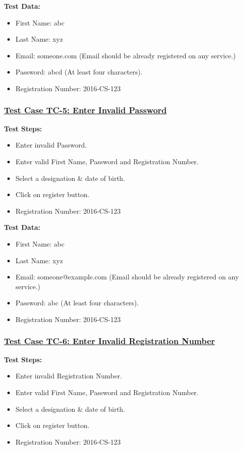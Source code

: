\textbf{Test Data:}
\begin{itemize}

\item First Name: abc
\item Last Name: xyz
\item Email: someone.com (Email should be already registered on any service.)
\item Password: abcd (At least four characters).
\item Registration Number: 2016-CS-123

\end{itemize}

\subsubsection{\underline{Test Case TC-5: Enter Invalid Password}}
\textbf{Test Steps:}
\begin{itemize}

\item Enter invalid Password.
\item Enter valid First Name, Password and Registration Number.
\item Select a designation \& date of birth.
\item Click on register button.
\item Registration Number: 2016-CS-123

\end{itemize}

\textbf{Test Data:}
\begin{itemize}

\item First Name: abc
\item Last Name: xyz
\item Email: someone@example.com (Email should be already registered on any service.)
\item Password: abc (At least four characters).
\item Registration Number: 2016-CS-123

\end{itemize}

\subsubsection{\underline{Test Case TC-6: Enter Invalid Registration Number}}
\textbf{Test Steps:}
\begin{itemize}

\item Enter invalid Registration Number.
\item Enter valid First Name, Password and Registration Number.
\item Select a designation \& date of birth.
\item Click on register button.
\item Registration Number: 2016-CS-123

\end{itemize}

